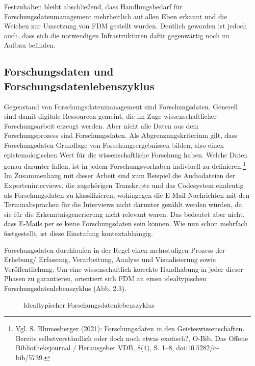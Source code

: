 Festzuhalten bleibt abschließend, dass Handlungsbedarf für Forschungsdatenmanagement mehrheitlich auf allen Eben erkannt und die Weichen zur Umsetzung von FDM gestellt wurden. Deutlich geworden ist jedoch auch, dass sich die notwendigen Infrastrukturen dafür gegenwärtig noch im Aufbau befinden.   

\subsection{Forschungsdaten und Forschungsdatenlebenszyklus}

Gegenstand von Forschungsdatenmanagement sind Forschungsdaten. Generell sind damit digitale Ressourcen gemeint, die im Zuge wissenschaftlicher Forschungsarbeit erzeugt werden. Aber nicht alle Daten aus dem Forschungsprozess sind Forschungsdaten. Als Abgrenzungskriterium gilt, dass Forschungsdaten Grundlage von Forschungsergebnissen bilden, also einen epistemologischen Wert  für die wissenschaftliche Forschung haben. Welche Daten genau darunter fallen, ist in jedem Forschungsvorhaben indiviuell zu definieren.\footnote{Vgl. S. Blumesberger (2021): Forschungsdaten in den Geisteswissenschaften. Bereits selbstverständlich oder doch noch etwas exotisch?, O-Bib. Das Offene Bibliotheksjournal / Herausgeber VDB, 8(4), S. 1–8, doi:10.5282/o-bib/5739.} Im Zusammenhang mit dieser Arbeit sind zum Beispiel die Audiodateien der Experteninterviews, die zugehörigen Transkripte und das Codesystem eindeutig als Forschungsdaten zu klassifizieren, wohingegen die E-Mail-Nachrichten mit den Terminabsprachen für die Interviews nicht darunter gezählt werden würden, da sie für die Erkenntnisgenerierung nicht relevant waren. Das bedeutet aber nicht, dass E-Mails per se keine Forschungsdaten sein können. Wie nun schon mehrfach festgestellt, ist diese Einstufung kontextabhängig.

Forschungsdaten durchlaufen in der Regel einen mehrstufigen Prozess der Erhebung/ Erfassung, Verarbeitung, Analyse und Visualisierung sowie Veröffentlichung. Um eine wissenschaftlich korrekte Handhabung in jeder dieser Phasen zu garantieren, orientiert sich FDM an einen idealtypischen Forschungsdatenlebenszyklus (Abb. 2.3).

\begin{figure}[h]
    \centering
    \caption{Idealtypischer Forschungsdatenlebenszyklus\protect\footnotemark}
    \label{fig:x cubed graph}
\end{figure} 

